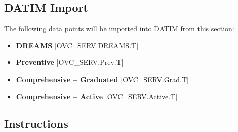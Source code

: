 \documentclass[
  openany]{book}
\begin{document}
\hypertarget{datim-import-37}{%
\subsection{DATIM Import}\label{datim-import-37}}

The following data points will be imported into DATIM from this section:

\begin{itemize}
\item
  \textbf{DREAMS} {[}OVC\_SERV.DREAMS.T{]}
\item
  \textbf{Preventive} {[}OVC\_SERV.Prev.T{]}
\item
  \textbf{Comprehensive -- Graduated} {[}OVC\_SERV.Grad.T{]}
\item
  \textbf{Comprehensive -- Active} {[}OVC\_SERV.Active.T{]}
\end{itemize}

\hypertarget{instructions-37}{%
\subsection{Instructions}\label{instructions-37}}
\end{document}
